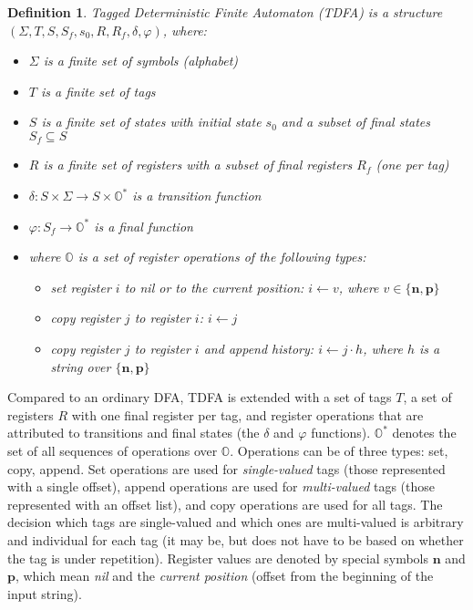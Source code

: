 \documentclass[]{article}
\newtheorem{definition}{Definition}
\newcommand{\YO}{\mathbb{O}}
\begin{document}
\begin{definition} \label{def_tnfa}
Tagged Deterministic Finite Automaton (TDFA)
is a structure $(\Sigma, T, S, S_f, s_0, R, R_f, \delta, \varphi)$, where:
\begin{itemize}
    \item[] $\Sigma$ is a finite set of symbols (alphabet)
    \item[] $T$ is a finite set of tags
    \item[] $S$ is a finite set of states with initial state $s_0$ and a subset of final states $S_f \subseteq S$
    \item[] $R$ is a finite set of registers with a subset of final registers $R_f$ (one per tag)
    \item[] $\delta : S \times \Sigma \rightarrow S \times \YO^*$ is a transition function
    \item[] $\varphi : S_f \rightarrow \YO^*$ is a final function
    \medskip
    \item[] where $\YO$ is a set of register operations of the following types:
    \begin{itemize}
        \item[] set register $i$ to nil or to the current position: $i \leftarrow v$, where $v \in \{\mathbf{n}, \mathbf{p}\}$
        \item[] copy register $j$ to register $i$: $i \leftarrow j$
        \item[] copy register $j$ to register $i$ and append history: $i \leftarrow j \cdot h$, where $h$ is a string over $\{\mathbf{n}, \mathbf{p}\}$
    \end{itemize}
\end{itemize}
\end{definition}

Compared to an ordinary DFA, TDFA is extended with a set of tags $T$,
a set of registers $R$ with one final register per tag,
and register operations that are attributed to transitions and final states (the $\delta$ and $\varphi$ functions).
$\YO^*$ denotes the set of all sequences of operations over $\YO$.
Operations can be of three types: set, copy, append.
Set operations are used for \emph{single-valued} tags (those represented with a single offset),
append operations are used for \emph{multi-valued} tags (those represented with an offset list), and
copy operations are used for all tags.
The decision which tags are single-valued and which ones are multi-valued is arbitrary and individual for each tag
(it may be, but does not have to be based on whether the tag is under repetition).
%
Register values are denoted by special symbols $\mathbf{n}$ and $\mathbf{p}$, which mean \emph{nil} and the \emph{current position} (offset from the beginning of the input string).
\medskip
\end{document}
